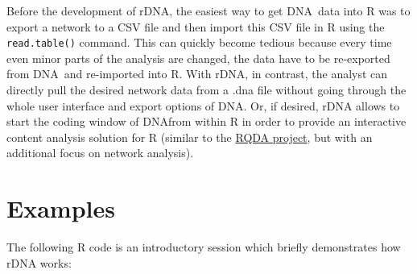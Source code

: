 \documentclass[12pt,a4paper]{scrreprt}
\newcommand{\dnashort}{\textsc{DNA}}
\newcommand{\code}[1]{\texttt{#1}}
\begin{document}
Before the development of rDNA, the easiest way to get \dnashort\ data into R was to export a network to a CSV file and then import this CSV file in R using the \code{read.table()} command. This can quickly become tedious because every time even minor parts of the analysis are changed, the data have to be re-exported from \dnashort\ and re-imported into R. With rDNA, in contrast, the analyst can directly pull the desired network data from a .dna file without going through the whole user interface and export options of \dnashort. Or, if desired, rDNA allows to start the coding window of \dnashort from within R in order to provide an interactive content analysis solution for R (similar to the \href{http://rqda.r-forge.r-project.org}{RQDA project}, but with an additional focus on network analysis).

\section{Examples}
The following R code is an introductory session which briefly demonstrates how rDNA works:

\end{document}
